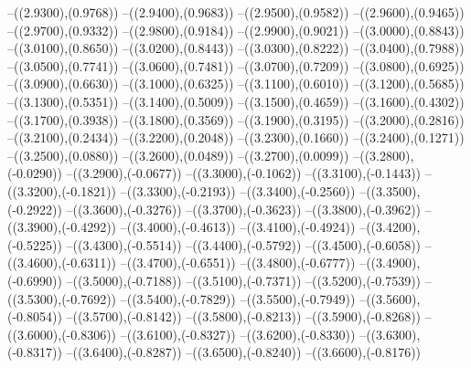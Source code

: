 {	--({\sx*(2.9300)},{\sy*(0.9768)})
	--({\sx*(2.9400)},{\sy*(0.9683)})
	--({\sx*(2.9500)},{\sy*(0.9582)})
	--({\sx*(2.9600)},{\sy*(0.9465)})
	--({\sx*(2.9700)},{\sy*(0.9332)})
	--({\sx*(2.9800)},{\sy*(0.9184)})
	--({\sx*(2.9900)},{\sy*(0.9021)})
	--({\sx*(3.0000)},{\sy*(0.8843)})
	--({\sx*(3.0100)},{\sy*(0.8650)})
	--({\sx*(3.0200)},{\sy*(0.8443)})
	--({\sx*(3.0300)},{\sy*(0.8222)})
	--({\sx*(3.0400)},{\sy*(0.7988)})
	--({\sx*(3.0500)},{\sy*(0.7741)})
	--({\sx*(3.0600)},{\sy*(0.7481)})
	--({\sx*(3.0700)},{\sy*(0.7209)})
	--({\sx*(3.0800)},{\sy*(0.6925)})
	--({\sx*(3.0900)},{\sy*(0.6630)})
	--({\sx*(3.1000)},{\sy*(0.6325)})
	--({\sx*(3.1100)},{\sy*(0.6010)})
	--({\sx*(3.1200)},{\sy*(0.5685)})
	--({\sx*(3.1300)},{\sy*(0.5351)})
	--({\sx*(3.1400)},{\sy*(0.5009)})
	--({\sx*(3.1500)},{\sy*(0.4659)})
	--({\sx*(3.1600)},{\sy*(0.4302)})
	--({\sx*(3.1700)},{\sy*(0.3938)})
	--({\sx*(3.1800)},{\sy*(0.3569)})
	--({\sx*(3.1900)},{\sy*(0.3195)})
	--({\sx*(3.2000)},{\sy*(0.2816)})
	--({\sx*(3.2100)},{\sy*(0.2434)})
	--({\sx*(3.2200)},{\sy*(0.2048)})
	--({\sx*(3.2300)},{\sy*(0.1660)})
	--({\sx*(3.2400)},{\sy*(0.1271)})
	--({\sx*(3.2500)},{\sy*(0.0880)})
	--({\sx*(3.2600)},{\sy*(0.0489)})
	--({\sx*(3.2700)},{\sy*(0.0099)})
	--({\sx*(3.2800)},{\sy*(-0.0290)})
	--({\sx*(3.2900)},{\sy*(-0.0677)})
	--({\sx*(3.3000)},{\sy*(-0.1062)})
	--({\sx*(3.3100)},{\sy*(-0.1443)})
	--({\sx*(3.3200)},{\sy*(-0.1821)})
	--({\sx*(3.3300)},{\sy*(-0.2193)})
	--({\sx*(3.3400)},{\sy*(-0.2560)})
	--({\sx*(3.3500)},{\sy*(-0.2922)})
	--({\sx*(3.3600)},{\sy*(-0.3276)})
	--({\sx*(3.3700)},{\sy*(-0.3623)})
	--({\sx*(3.3800)},{\sy*(-0.3962)})
	--({\sx*(3.3900)},{\sy*(-0.4292)})
	--({\sx*(3.4000)},{\sy*(-0.4613)})
	--({\sx*(3.4100)},{\sy*(-0.4924)})
	--({\sx*(3.4200)},{\sy*(-0.5225)})
	--({\sx*(3.4300)},{\sy*(-0.5514)})
	--({\sx*(3.4400)},{\sy*(-0.5792)})
	--({\sx*(3.4500)},{\sy*(-0.6058)})
	--({\sx*(3.4600)},{\sy*(-0.6311)})
	--({\sx*(3.4700)},{\sy*(-0.6551)})
	--({\sx*(3.4800)},{\sy*(-0.6777)})
	--({\sx*(3.4900)},{\sy*(-0.6990)})
	--({\sx*(3.5000)},{\sy*(-0.7188)})
	--({\sx*(3.5100)},{\sy*(-0.7371)})
	--({\sx*(3.5200)},{\sy*(-0.7539)})
	--({\sx*(3.5300)},{\sy*(-0.7692)})
	--({\sx*(3.5400)},{\sy*(-0.7829)})
	--({\sx*(3.5500)},{\sy*(-0.7949)})
	--({\sx*(3.5600)},{\sy*(-0.8054)})
	--({\sx*(3.5700)},{\sy*(-0.8142)})
	--({\sx*(3.5800)},{\sy*(-0.8213)})
	--({\sx*(3.5900)},{\sy*(-0.8268)})
	--({\sx*(3.6000)},{\sy*(-0.8306)})
	--({\sx*(3.6100)},{\sy*(-0.8327)})
	--({\sx*(3.6200)},{\sy*(-0.8330)})
	--({\sx*(3.6300)},{\sy*(-0.8317)})
	--({\sx*(3.6400)},{\sy*(-0.8287)})
	--({\sx*(3.6500)},{\sy*(-0.8240)})
	--({\sx*(3.6600)},{\sy*(-0.8176)})
}

